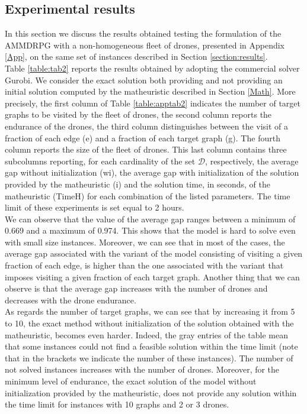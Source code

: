 \documentclass[10pt,a4paper]{elsarticle}
\def\AMD{{\sf AMMDRPG\xspace}}
\newcommand{\EN}[1]{{\color{black}#1}}
\begin{document}
			\subsection*{Experimental results}
			\noindent
			In this section we discuss the results obtained testing the formulation of the \AMD\xspace with a non\EN{-}homogeneous fleet of drones, presented in Appendix \ref{App}, on the same set of instances described in Section \ref{section:results}.\\
			\noindent
			Table \ref{table:tab2} reports the results obtained by adopting the commercial solver Gurobi. We consider the exact solution both providing and not providing an initial solution computed by the matheuristic described in Section \ref{Math}. More precisely, the first column of Table \ref{table:apptab2} indicates the number of target graphs to be visited by the fleet of drones, the second column reports the endurance of the drones, the third column distinguishes between the visit of a fraction of each edge (e) and a fraction of each target graph (g). The fourth column reports the size of the fleet of drones. This last column contains three subcolumns reporting, for each cardinality of the set $\mathcal D$, respectively, the average gap without initialization (wi), the average gap with initialization of the solution provided by the matheuristic (i) and the solution time, in seconds, of the matheuristic (TimeH) for each combination of the listed parameters. The time limit of these experiments is set equal to 2 hours.\\
			We can observe that the value of the average gap ranges between a minimum of 0.669 and a maximum of 0.974. This shows that the model is hard to \EN{solve} even with small size instances. Moreover, we can see that in most of the cases, the average gap associated with the variant of the model consisting \EN{of} visiting a given fraction of each edge, is higher than the one associated with the variant that imposes \EN{visiting} a given fraction of each target graph. Another thing that we can observe is that the average gap increases with the number of drones and decreases with the drone endurance.\\
			\noindent
			As regards the number of target graphs, we can see that by increasing it from 5 to 10, the exact method without initialization of the solution obtained with the matheuristic, becomes even harder. Indeed, the gray entries of the table mean that some instances could not find a feasible solution within the time limit (note that in the brackets we indicate the number of these instances). The number of not solved instances increases with the number of drones. Moreover, for the minimum level of endurance, the exact solution of the model without initialization provided by the matheuristic, does not provide any solution within the time limit for instances with 10 graphs and 2 or 3 drones.\\
\end{document}
